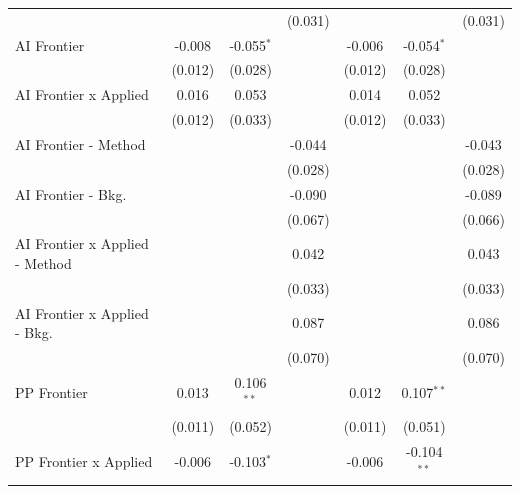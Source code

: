 \begin{tabular}{lcccccc}
                                  &                &               & (0.031)       &                &               & (0.031)\\   
   AI Frontier                    & -0.008         & -0.055$^{*}$  &               & -0.006         & -0.054$^{*}$  &   \\   
                                  & (0.012)        & (0.028)       &               & (0.012)        & (0.028)       &   \\   
   AI Frontier x Applied          & 0.016          & 0.053         &               & 0.014          & 0.052         &   \\   
                                  & (0.012)        & (0.033)       &               & (0.012)        & (0.033)       &   \\   
   AI Frontier - Method           &                &               & -0.044        &                &               & -0.043\\   
                                  &                &               & (0.028)       &                &               & (0.028)\\   
   AI Frontier - Bkg.             &                &               & -0.090        &                &               & -0.089\\   
                                  &                &               & (0.067)       &                &               & (0.066)\\   
   AI Frontier x Applied - Method &                &               & 0.042         &                &               & 0.043\\   
                                  &                &               & (0.033)       &                &               & (0.033)\\   
   AI Frontier x Applied - Bkg.   &                &               & 0.087         &                &               & 0.086\\   
                                  &                &               & (0.070)       &                &               & (0.070)\\   
   PP Frontier                    & 0.013          & 0.106$^{**}$  &               & 0.012          & 0.107$^{**}$  &   \\   
                                  & (0.011)        & (0.052)       &               & (0.011)        & (0.051)       &   \\   
   PP Frontier x Applied          & -0.006         & -0.103$^{*}$  &               & -0.006         & -0.104$^{**}$ &   \\   

\end{tabular}
